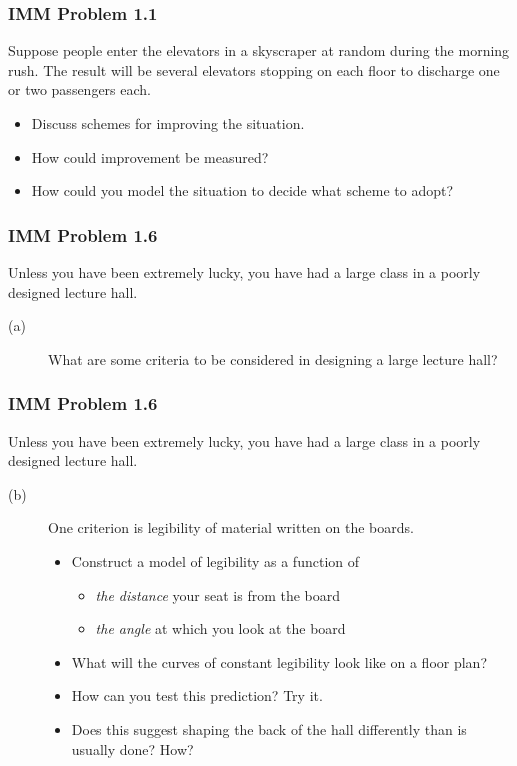 \begin{frame}
    \frametitle{IMM Problem 1.1}
    Suppose people enter the elevators in a skyscraper at random during the
    morning rush. The result will be several elevators stopping on each floor
    to discharge one or two passengers each. 
    \vskip0.1in
    \begin{itemize}
        \item Discuss schemes for improving the situation. 
        \item How could improvement be measured? 
        \item How could you model the situation to decide what scheme to adopt?
    \end{itemize}
\end{frame}

\begin{frame}
    \frametitle{IMM Problem 1.6}
    Unless you have been extremely lucky, you have had a large class in a
    poorly designed lecture hall. 
    
    \vskip0.25in
    \begin{description}
        \item[(a)] What are some criteria to be considered
    in designing a large lecture hall? 
    \end{description}
\end{frame}
    
\begin{frame}
    \frametitle{IMM Problem 1.6}
    Unless you have been extremely lucky, you have had a large class in a
    poorly designed lecture hall. 
    \vskip0.15in
    \begin{description}
        \item[(b)] One criterion is legibility of material written on the boards. 
        \begin{itemize}
            \item Construct a model of legibility as a function of 
                \begin{itemize}
                    \item  \emph{the distance} your seat is from the board 
                    \item \emph{the angle} at which you look at the board 
                \end{itemize}
            \item What will the curves of constant legibility look like on a
                floor plan?
            \item How can you test this prediction? Try it. 
            \item Does this suggest shaping the back of the hall differently
                than is usually done? How?
        \end{itemize}    
    \end{description}
    \vfill
\end{frame}
     
